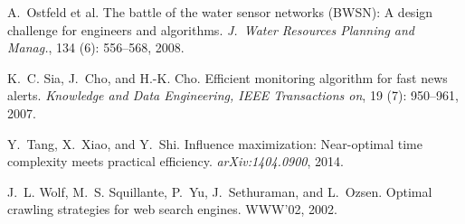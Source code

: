 \begin{thebibliography}{41}
A.~Ostfeld et al.
\newblock The battle of the water sensor networks ({BWSN}): A design challenge
  for engineers and algorithms.
\newblock \emph{J.~Water Resources Planning and Manag.},
  134 (6): 556--568, 2008.

K.~C. Sia, J.~Cho, and H.-K. Cho.
\newblock Efficient monitoring algorithm for fast news alerts.
\newblock \emph{Knowledge and Data Engineering, IEEE Transactions on},
  19 (7): 950--961, 2007.

Y.~Tang, X.~Xiao, and Y.~Shi.
\newblock Influence maximization: Near-optimal time complexity meets practical
  efficiency.
\newblock \emph{arXiv:1404.0900}, 2014.

J.~L. Wolf, M.~S. Squillante, P.~Yu, J.~Sethuraman, and L.~Ozsen.
\newblock Optimal crawling strategies for web search engines.
\newblock WWW'02, 2002.
\end{thebibliography}
